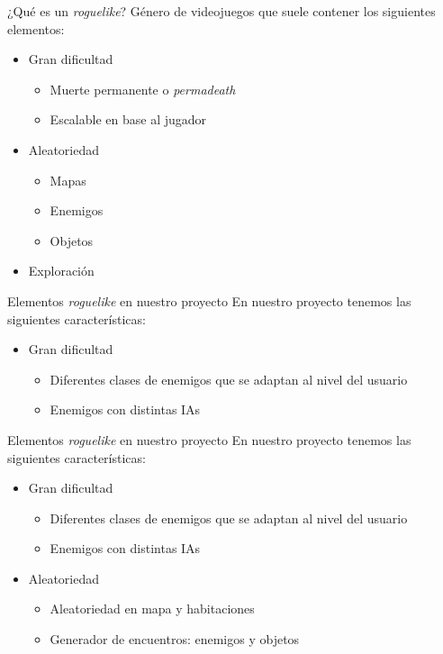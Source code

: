 \begin{tframe}{¿Qué es un \textit{roguelike}?}
	Género de videojuegos que suele contener los siguientes elementos:
	\begin{itemize}
		\item Gran dificultad
			\begin{itemize}
				\item Muerte permanente o \textit{permadeath}
				\item Escalable en base al jugador
			\end{itemize}
		\item Aleatoriedad
		\begin{itemize}
			\item Mapas
			\item Enemigos
			\item Objetos
		\end{itemize}
			\item<+-| alert@+> Exploración
	\end{itemize}
\end{tframe}


\begin{tframe}{Elementos \textit{roguelike} en nuestro proyecto}
	En nuestro proyecto tenemos las siguientes características:
	\begin{itemize}
		\item<+-| alert@+> Gran dificultad
			\begin{itemize}
				\item Diferentes clases de enemigos que se adaptan al nivel del usuario
				\item Enemigos con distintas IAs
			\end{itemize}
	\end{itemize}
\end{tframe}

\begin{tframe}{Elementos \textit{roguelike} en nuestro proyecto}
	En nuestro proyecto tenemos las siguientes características:
	\begin{itemize}
		\item Gran dificultad
			\begin{itemize}
				\item Diferentes clases de enemigos que se adaptan al nivel del usuario
				\item Enemigos con distintas IAs
			\end{itemize}
		\item<+-| alert@+> Aleatoriedad
		\begin{itemize}
			\item Aleatoriedad en mapa y habitaciones
			\item Generador de encuentros: enemigos y objetos
		\end{itemize}
	\end{itemize}
\end{tframe}

